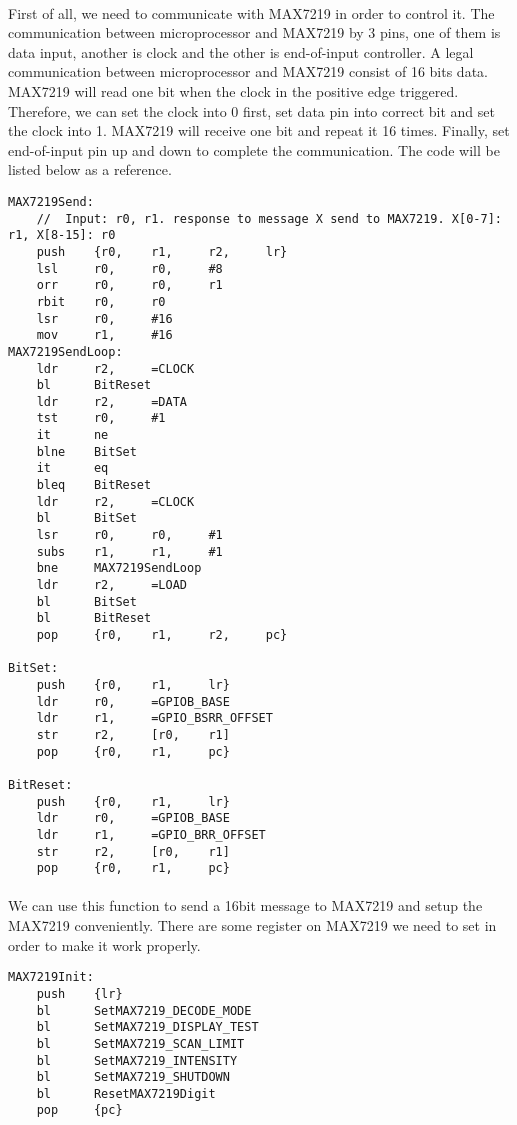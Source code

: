 \paragraph{}
First of all, we need to communicate with MAX7219 in order to control it. The communication between microprocessor and MAX7219 by 3 pins, one of them is data input, another is clock and the other is end-of-input controller. A legal communication between microprocessor and MAX7219 consist of 16 bits data. MAX7219 will read one bit when the clock in the positive edge triggered. Therefore, we can set the clock into 0 first, set data pin into correct bit and set the clock into 1. MAX7219 will receive one bit and repeat it 16 times. Finally, set end-of-input pin up and down to complete the communication. The code will be listed below as a reference.
\begin{lstlisting}
MAX7219Send:
    //  Input: r0, r1. response to message X send to MAX7219. X[0-7]: r1, X[8-15]: r0
    push    {r0,    r1,     r2,     lr}
    lsl     r0,     r0,     #8
    orr     r0,     r0,     r1
    rbit    r0,     r0
    lsr     r0,     #16
    mov     r1,     #16
MAX7219SendLoop:
    ldr     r2,     =CLOCK
    bl      BitReset
    ldr     r2,     =DATA
    tst     r0,     #1
    it      ne
    blne    BitSet
    it      eq
    bleq    BitReset
    ldr     r2,     =CLOCK
    bl      BitSet
    lsr     r0,     r0,     #1
    subs    r1,     r1,     #1
    bne     MAX7219SendLoop
    ldr     r2,     =LOAD
    bl      BitSet
    bl      BitReset
    pop     {r0,    r1,     r2,     pc}

BitSet:
    push    {r0,    r1,     lr}
    ldr     r0,     =GPIOB_BASE
    ldr     r1,     =GPIO_BSRR_OFFSET
    str     r2,     [r0,    r1]
    pop     {r0,    r1,     pc}

BitReset:
    push    {r0,    r1,     lr}
    ldr     r0,     =GPIOB_BASE
    ldr     r1,     =GPIO_BRR_OFFSET
    str     r2,     [r0,    r1]
    pop     {r0,    r1,     pc}
\end{lstlisting}
\paragraph{}
We can use this function to send a 16bit message to MAX7219 and setup the MAX7219 conveniently. There are some register on MAX7219 we need to set in order to make it work properly.
\begin{lstlisting}
MAX7219Init:
    push    {lr}
    bl      SetMAX7219_DECODE_MODE
    bl      SetMAX7219_DISPLAY_TEST
    bl      SetMAX7219_SCAN_LIMIT
    bl      SetMAX7219_INTENSITY
    bl      SetMAX7219_SHUTDOWN
    bl      ResetMAX7219Digit
    pop     {pc}
\end{lstlisting}
